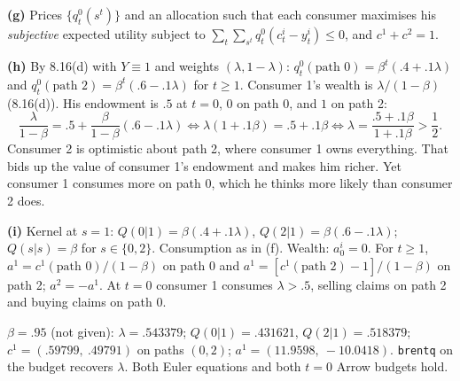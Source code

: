 \documentclass[12pt, letterpaper]{article}
\begin{document}
\begin{tcolorbox}[oddbox,title={Exercise 8.17 \quad Diverse beliefs, III}]
\textbf{(g)} Prices $\{q^0_t(s^t)\}$ and an allocation such that each consumer maximises his \emph{subjective}
expected utility subject to $\sum_t\sum_{s^t}q^0_t(c^i_t-y^i_t)\le0$, and $c^1+c^2=1$.

\textbf{(h)} By 8.16(d) with $Y\equiv1$ and weights $(\lambda,1-\lambda)$:
$q^0_t(\text{path }0)=\beta^t(.4+.1\lambda)$ and $q^0_t(\text{path }2)=\beta^t(.6-.1\lambda)$ for $t\ge1$. Consumer 1's
wealth is $\lambda/(1-\beta)$ (8.16(d)). His endowment is $.5$ at $t=0$, $0$ on path 0, and $1$ on path 2:
\[
\frac{\lambda}{1-\beta}=.5+\frac{\beta}{1-\beta}(.6-.1\lambda)\iff\lambda(1+.1\beta)=.5+.1\beta\iff
\boxed{\lambda=\frac{.5+.1\beta}{1+.1\beta}>\frac12 .}
\]
Consumer 2 is optimistic about path 2, where consumer 1 owns everything. That bids up the value of consumer 1's
endowment and makes him richer. Yet consumer 1 consumes more on path 0, which he thinks more likely than consumer 2
does.

\textbf{(i)} Kernel at $s=1$: $Q(0|1)=\beta(.4+.1\lambda)$, $Q(2|1)=\beta(.6-.1\lambda)$; $Q(s|s)=\beta$ for $s\in\{0,2\}$.
Consumption as in (f). Wealth: $a^i_0=0$. For $t\ge1$, $a^1=c^1(\text{path }0)/(1-\beta)$ on path 0 and
$a^1=[c^1(\text{path }2)-1]/(1-\beta)$ on path 2; $a^2=-a^1$. At $t=0$ consumer 1 consumes $\lambda>.5$, selling claims
on path 2 and buying claims on path 0.

\begin{tcolorbox}[databox]
$\beta=.95$ (not given): $\lambda=.543379$; $Q(0|1)=.431621$, $Q(2|1)=.518379$; $c^1=(.59799,\ .49791)$ on paths
$(0,2)$; $a^1=(11.9598,\ -10.0418)$. \texttt{brentq} on the budget recovers $\lambda$. Both Euler equations and
both $t=0$ Arrow budgets hold.
\end{tcolorbox}
\end{tcolorbox}
\end{document}
